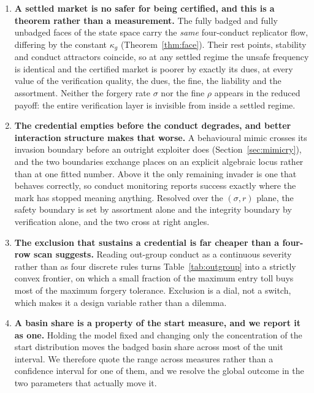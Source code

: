 \begin{enumerate}
\item \textbf{A settled market is no safer for being certified, and this is a
theorem rather than a measurement.} The fully badged and fully unbadged faces
of the state space carry the \emph{same} four-conduct replicator flow,
differing by the constant $\kappa_g$ (Theorem~\ref{thm:face}). Their rest
points, stability and conduct attractors coincide, so at any settled regime the
unsafe frequency is identical and the certified market is poorer by exactly its
dues, at every value of the verification quality, the dues, the fine, the
liability and the assortment. Neither the forgery rate $\sigma$ nor the fine
$\rho$ appears in the reduced payoff: the entire verification layer is
invisible from inside a settled regime.

\item \textbf{The credential empties before the conduct degrades, and better
interaction structure makes that worse.} A behavioural mimic crosses its
invasion boundary before an outright exploiter does
(Section~\ref{sec:mimicry}), and the two boundaries exchange places on an
explicit algebraic locus rather than at one fitted number. Above it the only
remaining invader is one that behaves correctly, so conduct monitoring reports
success exactly where the mark has stopped meaning anything. Resolved over the
$(\sigma, r)$ plane, the safety boundary is set by assortment alone and the
integrity boundary by verification alone, and the two cross at right angles.

\item \textbf{The exclusion that sustains a credential is far cheaper than a
four-row scan suggests.} Reading out-group conduct as a continuous severity
rather than as four discrete rules turns Table~\ref{tab:outgroup} into a
strictly convex frontier, on which a small fraction of the maximum entry toll
buys most of the maximum forgery tolerance. Exclusion is a dial, not a switch,
which makes it a design variable rather than a dilemma.

\item \textbf{A basin share is a property of the start measure, and we report
it as one.} Holding the model fixed and changing only the concentration of the
start distribution moves the badged basin share across most of the unit
interval. We therefore quote the range across measures rather than a confidence
interval for one of them, and we resolve the global outcome in the two
parameters that actually move it.
\end{enumerate}

